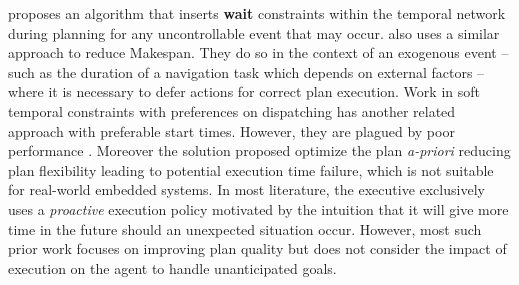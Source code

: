 
\cite{morris01} proposes an algorithm that inserts \textbf{wait}
constraints within the temporal network during planning for any uncontrollable
event that may occur. \cite{gallien2006} also uses a
similar approach to reduce Makespan. They do so in the context of
an exogenous event -- such as the duration of a navigation
task which depends on external factors -- where it is necessary to
defer actions for correct plan execution. Work in soft temporal
constraints with preferences \cite{khatib2001temporal} on dispatching
has another related approach with preferable start times. However,
they are plagued by poor performance \cite{bartak2002}. %
Moreover the solution proposed optimize the plan {\em a-priori}
reducing plan flexibility leading to potential execution time failure,
which is not suitable for real-world embedded systems. In most
literature, the executive exclusively uses a {\em proactive} execution
policy motivated by the intuition that it will give more time in the
future should an unexpected situation occur. However, most such prior
work focuses on improving plan quality but does not consider the
impact of execution on the agent to handle unanticipated goals.


